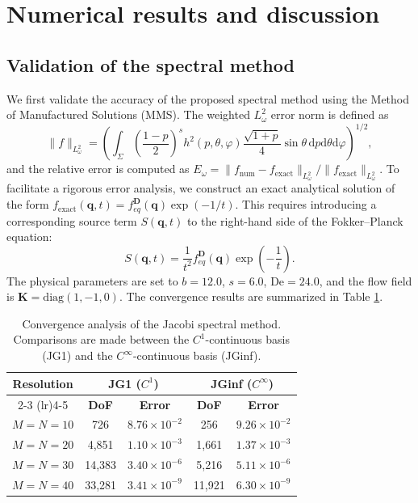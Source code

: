 \documentclass[preprint,12pt]{elsarticle}
\begin{document}
\section{Numerical results and discussion}

\subsection{Validation of the spectral method}
We first validate the accuracy of the proposed spectral method using the Method of Manufactured Solutions (MMS). The weighted $L_{\omega}^2$ error norm is defined as
\begin{equation}
    \| f \|_{L_{\omega}^2} = \left( \int_{\Sigma} \left(\frac{1-p}{2}\right)^s h^2(p,\theta,\varphi) \frac{\sqrt{1+p}}{4}\sin\theta \,\mathrm{d}p\mathrm{d}\theta\mathrm{d}\varphi \right)^{1/2},
\end{equation}
and the relative error is computed as $E_{\omega} = \| f_{\text{num}} - f_{\text{exact}} \|_{L_{\omega}^2} / \| f_{\text{exact}} \|_{L_{\omega}^2}$.
To facilitate a rigorous error analysis, we construct an exact analytical solution of the form $f_{\text{exact}}(\bm{q},t) = f_{eq}^{\boldsymbol{D}}(\bm{q})\exp(-1/t)$. This requires introducing a corresponding source term $S(\boldsymbol{q},t)$ to the right-hand side of the Fokker--Planck equation:
\begin{equation}
    S(\boldsymbol{q},t) = \frac{1}{t^2}f_{eq}^{\boldsymbol{D}}(\bm{q})\exp\left(-\frac{1}{t}\right).
\end{equation}
The physical parameters are set to $b=12.0$, $s=6.0$, $\mathrm{De}=24.0$, and the flow field is $\boldsymbol{K}=\text{diag}(1,-1,0)$. The convergence results are summarized in Table \ref{tab:spectral_error}.

\begin{table}[htbp]
    \centering
    \caption{Convergence analysis of the Jacobi spectral method. Comparisons are made between the $C^1$-continuous basis (JG1) and the $C^{\infty}$-continuous basis (JGinf).}
    \label{tab:spectral_error}
    \begin{tabular}{ccccc}
        \toprule
        \multirow{2}{*}{\textbf{Resolution}} & \multicolumn{2}{c}{\textbf{JG1 ($C^1$)}} & \multicolumn{2}{c}{\textbf{JGinf ($C^\infty$)}} \\
        \cmidrule(lr){2-3} \cmidrule(lr){4-5}
         & \textbf{DoF} & \textbf{Error} & \textbf{DoF} & \textbf{Error}\\
        \midrule
        $M=N=10$ & 726    & $8.76 \times 10^{-2}$ & 256    & $9.26 \times 10^{-2}$\\
        $M=N=20$ & 4,851  & $1.10 \times 10^{-3}$ & 1,661  & $1.37 \times 10^{-3}$\\
        $M=N=30$ & 14,383 & $3.40 \times 10^{-6}$ & 5,216  & $5.11 \times 10^{-6}$\\
        $M=N=40$ & 33,281 & $3.41 \times 10^{-9}$ & 11,921 & $6.30 \times 10^{-9}$\\
        \bottomrule
    \end{tabular}
\end{table}
\end{document}
